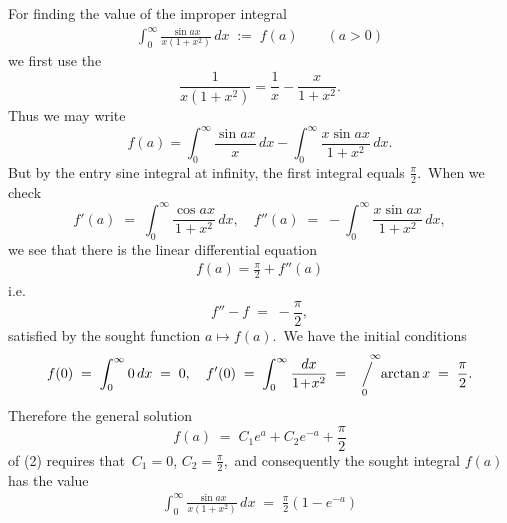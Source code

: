 \documentclass[12pt]{article}
\newcommand{\sijoitus}[2]%
{\operatornamewithlimits{\Big/}_{\!\!\!#1}^{\,#2}}
\begin{document}
For finding the value of the improper integral
\begin{align}
\int_0^\infty\!\frac{\sin{ax}}{x(1\!+\!x^2)}\,dx \;:=\; f(a) \qquad (a > 0) 
\end{align}
we first use the  
$$\frac{1}{x(1\!+\!x^2)} = \frac{1}{x}-\frac{x}{1\!+\!x^2}.$$
Thus we may write
$$f(a) = \int_0^\infty\frac{\sin{ax}}{x}\,dx-\int_0^\infty\frac{x\sin{ax}}{1+x^2}\,dx.$$
But by the entry sine integral at infinity, the first integral equals $\displaystyle\frac{\pi}{2}$.\, When we check
$$f'(a) \;=\; \int_0^\infty\frac{\cos{ax}}{1\!+\!x^2}\,dx, \quad 
f''(a) \;=\; -\!\int_0^\infty\frac{x\sin{ax}}{1\!+\!x^2}\,dx,$$
we see that there is the linear differential equation
\begin{align}
f(a) = \frac{\pi}{2}+f''(a)
\end{align}
i.e.
$$f''-f \;=\; -\frac{\pi}{2},$$
satisfied by the sought function $a \mapsto f(a)$.\, We have the initial conditions
$$f(0) \;=\; \int_0^\infty{0}\,dx \;=\; 0, \quad f'(0) \;=\; \int_0^\infty\frac{dx}{1\!+\!x^2} 
\;=\; \sijoitus{0}{\quad \infty}\!\arctan{x} \;=\; \frac{\pi}{2}.$$
Therefore the general solution 
$$f(a) \;=\; C_1e^a+C_2e^{-a}+\frac{\pi}{2}$$
of (2) requires that\, $C_1 = 0$,\; $C_2 = \frac{\pi}{2}$,\, and consequently the sought integral $f(a)$ has the value
\begin{align}
\int_0^\infty\!\frac{\sin{ax}}{x(1\!+\!x^2)}\,dx \;=\; \frac{\pi}{2}(1-e^{-a})
\end{align}


\end{document}
